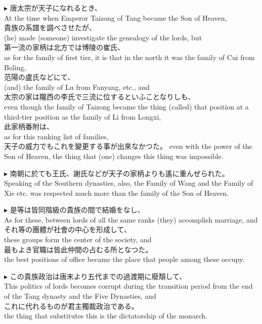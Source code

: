 \documentclass{ctexart}
\makeatletter
\newcommand*{\shifttext}[1]{%
  \settowidth{\@tempdima}{#1}%
  \hspace{-\@tempdima}#1%
}
\newcommand{\plabel}[1]{%
\shifttext{\textbf{#1}\quad}%
}
\newcommand{\prule}{%
\begin{center}%
\hdashrule[0.5ex]{.99\linewidth}{1pt}{1pt 2.5pt}%
\end{center}%
}
\makeatother
\begin{document}
\vspace{1em}
\plabel{$\blacktriangleright$}%
唐太宗が天子になれるとき、\\
At the time when Emperor Taizong of Tang became the Son of Heaven,\\
貴族の系譜を調べさせたが、\\
(he) made (someone) investigate the genealogy of the lords, but\\
第一流の家柄は北方では博陵の崔氏、\\
as for the family of first tier, it is that in the north it was the family of Cui from Boling,\\
范陽の盧氏などにて、\\
(and) the family of Lu from Fanyang, etc., and\\
太宗の家は隴西の李氏で三流に位するといふことなりしも、\\
even though the family of Taizong became the thing (called) that position at a third-tier position as the family of Li from Longxi,\\
此家柄番附は、\\
as for this ranking list of families,\\
天子の威力でもこれを變更する事が出來なかつた。
even with the power of the Son of Heaven, the thing that (one) changes this thing was impossible.

\vspace{1em}
\plabel{$\blacktriangleright$}%
南朝に於ても王氏、謝氏などが天子の家柄よりも遙に重んぜられた。
Speaking of the Southern dynasties, also, the Family of Wang and the Family of Xie etc. was respected much more than the family of the Son of Heaven.

\vspace{1em}
\plabel{$\blacktriangleright$}%
是等は皆同階級の貴族の間で結婚をなし、\\
As for these, between lords of all the same ranks (they) accomplish marriage, and\\
それ等の團體が社會の中心を形成して、\\
these groups form the center of the society, and\\
最もよき官職は皆此仲間の占むる所となつた。\\
the best positions of office became the place that people among these occupy.

\prule

\plabel{$\blacktriangleright$}%
この貴族政治は唐末より五代までの過渡期に廢頽して、\\
This politics of lords becomes corrupt during the transition period from the end of the Tang dynasty and the Five Dynasties, and\\
これに代れるものが君主獨裁政治である。\\
the thing that substitutes this is the dictatorship of the monarch.
\end{document}
